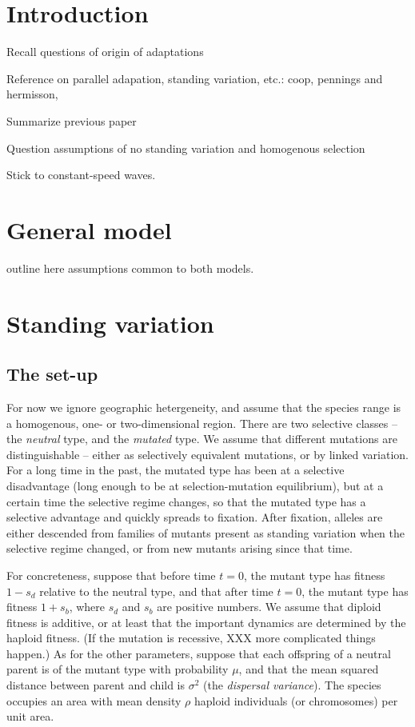 \documentclass{article}
\begin{document}
\section{Introduction}

Recall questions of origin of adaptations

Reference on parallel adapation, standing variation, etc.:
 coop,
 pennings and hermisson,

Summarize previous paper

Question assumptions of no standing variation and homogenous selection

Stick to constant-speed waves.

\section{General model}

outline here assumptions common to both models.

\section{Standing variation}

\subsection{The set-up}


For now we ignore geographic hetergeneity, and assume that the species range
is a homogenous, one- or two-dimensional region. 
There are two selective classes -- the {\em neutral} type, and the {\em mutated} type.
We assume that different mutations are distinguishable --
either as selectively equivalent mutations, or by linked variation.
For a long time in the past, the mutated type has been at a selective disadvantage (long enough to be at selection-mutation equilibrium),
but at a certain time the selective regime changes, so that the mutated type has a selective advantage and quickly spreads to fixation.
After fixation, alleles are either descended
from families of mutants present as standing variation when the selective regime changed,
or from new mutants arising since that time.

For concreteness, suppose that before time $t=0$,
the mutant type has fitness $1-s_d$ relative to the neutral type,
and that after time $t=0$,
the mutant type has fitness $1+s_b$,
where $s_d$ and $s_b$ are positive numbers.
We assume that diploid fitness is additive, or at least that the important dynamics are determined by the haploid fitness.
(If the mutation is recessive, XXX more complicated things happen.)
As for the other parameters,
suppose that each offspring of a neutral parent is of the mutant type with probability $\mu$,
and that the mean squared distance between parent and child is $\sigma^2$ (the {\em dispersal variance}).
The species occupies an area with mean density
$\rho$ haploid individuals (or chromosomes) per unit area.
\end{document}
